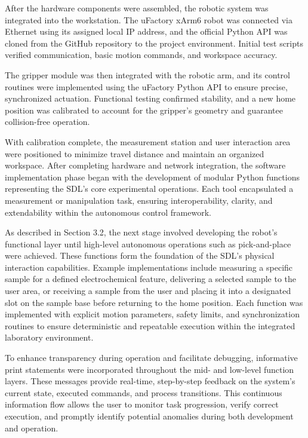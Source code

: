 After the hardware components were assembled, the robotic system was integrated into the workstation. The uFactory xArm6 robot was connected via Ethernet using its assigned local IP address, and the official Python API was cloned from the GitHub repository to the project environment. Initial test scripts verified communication, basic motion commands, and workspace accuracy.

The gripper module was then integrated with the robotic arm, and its control routines were implemented using the uFactory Python API to ensure precise, synchronized actuation. Functional testing confirmed stability, and a new home position was calibrated to account for the gripper’s geometry and guarantee collision-free operation.

With calibration complete, the measurement station and user interaction area were positioned to minimize travel distance and maintain an organized workspace. After completing hardware and network integration, the software implementation phase began with the development of modular Python functions representing the SDL’s core experimental operations. Each tool encapsulated a measurement or manipulation task, ensuring interoperability, clarity, and extendability within the autonomous control framework.

As described in Section 3.2, the next stage involved developing the robot’s functional layer until high-level autonomous operations such as pick-and-place were achieved. These functions form the foundation of the SDL’s physical interaction capabilities. Example implementations include measuring a specific sample for a defined electrochemical feature, delivering a selected sample to the user area, or receiving a sample from the user and placing it into a designated slot on the sample base before returning to the home position. Each function was implemented with explicit motion parameters, safety limits, and synchronization routines to ensure deterministic and repeatable execution within the integrated laboratory environment.

To enhance transparency during operation and facilitate debugging, informative print statements were incorporated throughout the mid- and low-level function layers. These messages provide real-time, step-by-step feedback on the system’s current state, executed commands, and process transitions. This continuous information flow allows the user to monitor task progression, verify correct execution, and promptly identify potential anomalies during both development and operation.

